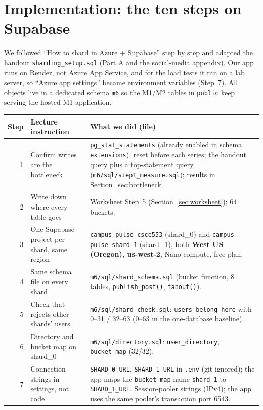 \section{Implementation: the ten steps on Supabase}\label{sec:steps}

We followed ``How to shard in Azure + Supabase'' step by step and adapted the handout
\texttt{sharding\_setup.sql} (Part A and the social-media appendix). Our app runs on Render, not Azure
App Service, and for the load tests it ran on a lab server, so ``Azure app settings'' became environment variables
(Step~7). All objects live in a dedicated schema \texttt{m6} so the M1/M2 tables in \texttt{public} keep serving
the hosted M1 application.

\begin{center}\small
\begin{tabularx}{\linewidth}{@{}r>{\raggedright}p{4.1cm}>{\raggedright\arraybackslash}X@{}}
\toprule
Step & Lecture instruction & What we did (file) \\
\midrule
1 & Confirm writes are the bottleneck & \texttt{pg\_stat\_statements} (already enabled in schema \texttt{extensions}),
  reset before each series; the handout query plus a top-statement query (\texttt{m6/sql/step1\_measure.sql});
  results in Section~\ref{sec:bottleneck}. \\
2 & Write down where every table goes & Worksheet Step~5 (Section~\ref{sec:worksheet}); 64 buckets. \\
3 & One Supabase project per shard, same region & \texttt{campus-pulse-csce553} (shard\_0) and
  \texttt{campus-pulse-shard-1} (shard\_1), both \textbf{West US (Oregon), us-west-2}, Nano compute, free plan. \\
4 & Same schema file on every shard & \texttt{m6/sql/shard\_schema.sql} (bucket function, 8 tables, \texttt{publish\_post()}, \texttt{fanout()}). \\
5 & Check that rejects other shards' users & \texttt{m6/sql/shard\_check.sql}: \texttt{users\_belong\_here} with 0--31 / 32--63
  (0--63 in the one-database baseline). \\
6 & Directory and bucket map on shard\_0 & \texttt{m6/sql/directory.sql}: \texttt{user\_directory}, \texttt{bucket\_map} (32/32). \\
7 & Connection strings in settings, not code & \texttt{SHARD\_0\_URL}, \texttt{SHARD\_1\_URL} in \texttt{.env} (git-ignored);
  the app maps the \texttt{bucket\_map} name \texttt{shard\_1} to \texttt{SHARD\_1\_URL}. Session-pooler strings (IPv4);
  the app uses the same pooler's transaction port 6543. \\

\end{tabularx}
\end{center}
